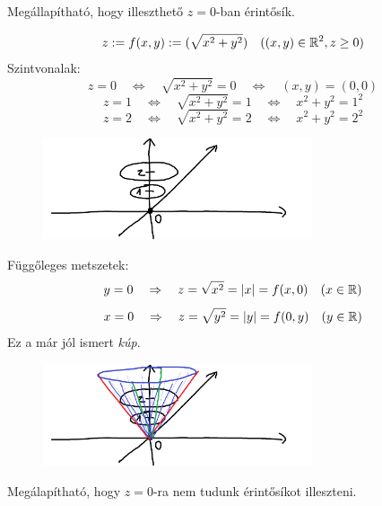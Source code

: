 \documentclass[a4paper,11.5pt]{article}
\begin{document}
	\begin{note}
		Megállapítható, hogy illeszthető $z=0$-ban érintősík.
	\end{note}
	\begin{task}
		\[ z:=f(x,y):=(\sqrt{x^2+y^2})\quad ((x,y)\in\mathbb{R}^2, z\geq 0) \]
		Szintvonalak:
		\[ z=0\quad \Leftrightarrow\quad \sqrt{x^2+y^2}=0\quad \Leftrightarrow\quad (x,y)=(0,0) \]
		\[ z=1\quad \Leftrightarrow\quad \sqrt{x^2+y^2}=1\quad \Leftrightarrow\quad x^2+y^2=1^2 \]
		\[ z=2\quad \Leftrightarrow\quad \sqrt{x^2+y^2}=2\quad \Leftrightarrow\quad x^2+y^2=2^2 \]
		\begin{figure}[H]
			\centering
			\includegraphics[height=3cm]{../2zh/kepek/20.png}
			\caption{}
		\end{figure}
		Függőleges metszetek:
		\[ y=0\quad \Rightarrow\quad z=\sqrt{x^2}=|x|=f(x,0)\quad (x\in\mathbb{R}) \]
		\[ x=0\quad \Rightarrow\quad z=\sqrt{y^2}=|y|=f(0,y)\quad (y\in\mathbb{R}) \]
		Ez a már jól ismert \textit{kúp}.
		\begin{figure}[H]
			\centering
			\includegraphics[height=3cm]{../2zh/kepek/21.png}
			\caption{}
		\end{figure}
	\end{task}
	\begin{note}
		Megálapítható, hogy $z=0$-ra nem tudunk érintősíkot illeszteni.
	\end{note}
\end{document}
